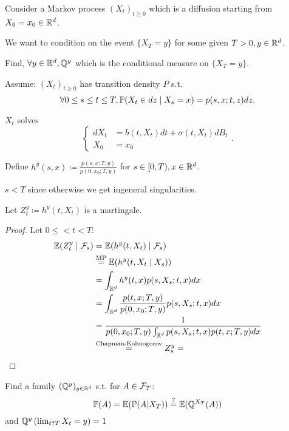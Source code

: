 Consider a Markov process $(X_t)_{t\geq 0}$ which is a 
diffusion starting from $X_0=x_0\in\mathbb{R}^d$. %

We want to condition on the event $\{X_T=y\}$ for some given $T>0,y\in\mathbb{R}^d$.

 Find, $\forall y\in \mathbb{R}^d, \mathbb{Q}^y$ which is the conditional measure on $\{X_T=y\}$.

Assume: $(X_t)_{t\geq 0}$ has transition density $P$ s.t. 
\[\forall 0\leq s\leq t\leq T,\mathbb{P}(X_t\in dz\mid X_s=x)=p(s,x;t,z)dz.\]

$X_t$ solves \[\begin{cases}dX_t &= b(t,X_t)dt+\sigma(t,X_t)dB_t\\
    X_0&=x_0
\end{cases}.\]

Define $h^y(s,x)\coloneqq \frac{p(s,x;T,y)}{p(0,x_0;T,y)}$ for $s\in [0,T),x\in\mathbb{R}^d$.

\begin{remark}
    $s<T$ since otherwise we get ingeneral singularities.
\end{remark}

\begin{lemma}\label{lem:2.4}
    Let $Z_t^y\coloneqq h^y(t,X_t)$ is a martingale. 
\end{lemma}

\begin{proof}
    Let $0\leq <t<T$:
    \begin{align*}
        \mathbb{E}(Z_t^y\mid\mathcal{F}_s)&=\mathbb{E}(h^y(t,X_t)\mid \mathcal{F}_s)\\
        &\stackrel{\text{MP}}{=}\mathbb{E}(h^y(t,X_t\mid X_s))\\
        &=\int_{\mathbb{R}^d} h^y(t,x)p(s,X_s;t,x)dx\\
        &=\int_{\mathbb{R}^d} \frac{p(t,x;T,y)}{p(0,x_0;T,y)}p(s,X_s;t,x)dx\\
        &=\frac{1}{p(0,x_0;T,y)\int_{\mathbb{R}^d}p(s,X_s;t,x)p(t,x;T,y)dx}\\
        &\stackrel{\text{Chapman-Kolmogorov}}{=} Z_s^y=
    \end{align*}
\end{proof}


\begin{aremark}
     Find a family $(\mathbb{Q}^y)_{y\in\mathbb{R}^d}$ s.t. for $A\in \mathcal{F}_T$:
    \[\mathbb{P}(A)=\mathbb{E}(\mathbb{P}(A|X_T))\stackrel{?}{=}\mathbb{E}(\mathbb{Q}^{X_T}(A))\]
    and $\mathbb{Q}^y\left(\lim_{t\uparrow T} X_t=y\right)=1$
\end{aremark}

